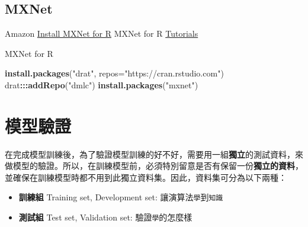 \documentclass[
]{book}
\newenvironment{Shaded}{\begin{snugshade}}{\end{snugshade}}
\newcommand{\DataTypeTok}[1]{\textcolor[rgb]{0.13,0.29,0.53}{#1}}
\newcommand{\KeywordTok}[1]{\textcolor[rgb]{0.13,0.29,0.53}{\textbf{#1}}}
\newcommand{\NormalTok}[1]{#1}
\newcommand{\OperatorTok}[1]{\textcolor[rgb]{0.81,0.36,0.00}{\textbf{#1}}}
\newcommand{\StringTok}[1]{\textcolor[rgb]{0.31,0.60,0.02}{#1}}
\providecommand{\tightlist}{%
  \setlength{\itemsep}{0pt}\setlength{\parskip}{0pt}}
\begin{document}
\begin{Shaded}
\end{Shaded}

\hypertarget{mxnet}{%
\subsection{MXNet}\label{mxnet}}

Amazon
\href{http://mxnet.io/get_started/windows_setup.html\#install-mxnet-for-r}{Install MXNet for R}
MXNet for R \href{http://mxnet.io/tutorials/index.html\#r}{Tutorials}

MXNet for R

\begin{Shaded}
\begin{Highlighting}[]
\KeywordTok{install.packages}\NormalTok{(}\StringTok{"drat"}\NormalTok{, }\DataTypeTok{repos=}\StringTok{"https://cran.rstudio.com"}\NormalTok{)}
\NormalTok{drat}\OperatorTok{:::}\KeywordTok{addRepo}\NormalTok{(}\StringTok{"dmlc"}\NormalTok{)}
\KeywordTok{install.packages}\NormalTok{(}\StringTok{"mxnet"}\NormalTok{)}
\end{Highlighting}
\end{Shaded}

\hypertarget{ux6a21ux578bux9a57ux8b49}{%
\section{模型驗證}\label{ux6a21ux578bux9a57ux8b49}}

在完成模型訓練後，為了驗證模型訓練的好不好，需要用一組\textbf{獨立}的測試資料，來做模型的驗證。所以，在訓練模型前，必須特別留意是否有保留一份\textbf{獨立的資料}，並確保在訓練模型時都不用到此獨立資料集。因此，資料集可分為以下兩種：

\begin{itemize}
\tightlist
\item
  \textbf{訓練組} Training set, Development set: 讓演算法\texttt{學}到\texttt{知識}
\item
  \textbf{測試組} Test set, Validation set: 驗證\texttt{學}的怎麼樣
\end{itemize}
\end{document}
